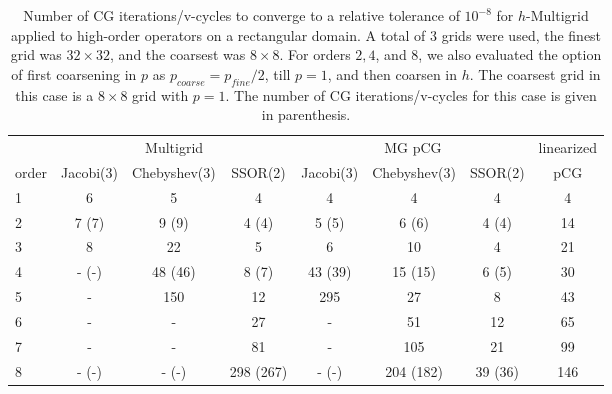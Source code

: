 \begin{table}
  \caption{\label{tab:box} Number of CG iterations/v-cycles to converge to a relative tolerance of $10^{-8}$ for $h$-Multigrid applied to high-order operators on a rectangular domain. A total of 3 grids were used, the finest grid was $32\times 32$, and the coarsest was $8\times 8$. For orders $2,4$, and $8$, we also evaluated the option of first coarsening in $p$ as $p_{coarse} = p_{fine}/2$, till $p=1$, and then coarsen in $h$. The coarsest grid in this case is a $8\times 8$ grid with $p=1$. The number of CG iterations/v-cycles for this case is given in parenthesis.}
		\centering
    \begin{tabular}{|l|c|c|c|c|c|c|c|} 
\hline
                     & \multicolumn{3}{c|}{Multigrid} & \multicolumn{3}{c|}{MG pCG} &          linearized \\
										 \cline{2-7}
			order &          \scriptsize Jacobi(3) &   \scriptsize  Chebyshev(3) & \scriptsize SSOR(2) & \scriptsize Jacobi(3) & \scriptsize  Chebyshev(3) & \scriptsize SSOR(2) & pCG\\
\hline
                   1 &                              6 &                           5 &                   4 &                     4 &                         4 &                   4 &   4\\
                   2 &                          7 (7) &                       9 (9) &               4 (4) &                 5 (5) &                     6 (6) &               4 (4) &  14\\
                   3 &                              8 &                          22 &                   5 &                     6 &                        10 &                   4 &  21\\
                   4 &                          - (-) &                     48 (46) &               8 (7) &               43 (39) &                   15 (15) &               6 (5) &  30\\
                   5 &                              - &                         150 &                  12 &                   295 &                        27 &                   8 &  43\\
                   6 &                              - &                           - &                  27 &                     - &                        51 &                  12 &  65\\
                   7 &                              - &                           - &                  81 &                     - &                       105 &                  21 &  99\\
                   8 &                          - (-) &                       - (-) &           298 (267) &                 - (-) &                 204 (182) &             39 (36) & 146\\
\hline
	  \end{tabular}
\end{table}

